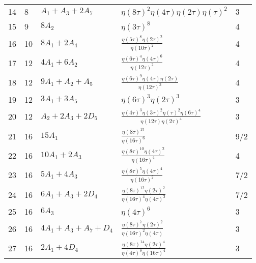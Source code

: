 \documentclass{article}
\theoremstyle{definition}
\begin{document}
\begin{longtable}{|l|l|l|l|l|}
  14 & 8 & $ A_{1} +  A_{3} + 2 A_{7}$ & $ \eta \left( 8\tau \right)   ^{2}\eta \left( 4\tau \right) \eta \left( 2\tau \right)   \eta \left( \tau \right)   ^{2}$ & 3 \\ 
  15 & 9 & $8 A_{2}$ & $ \eta \left( 3\tau \right)   ^{8}$ & 4 \\ 
  16 & 10 & $8 A_{1} + 2 A_{4}$ & ${\frac {  \eta \left( 5\tau \right)   ^{8}  \eta \left( 2\tau \right)   ^{2}}{  \eta \left( 10\tau \right)   ^{2}}}$ & 4 \\ 
  17 & 12 & $4 A_{1} + 6 A_{2}$ & ${\frac {  \eta \left( 6\tau \right)   ^{4}  \eta \left( 4\tau \right)   ^{6}}{  \eta \left( 12\tau \right)   ^{2}}}$ & 4 \\ 
  18 & 12 & $9 A_{1} +  A_{2} +  A_{5}$ & ${\frac {  \eta \left( 6\tau \right)   ^{9}\eta \left( 4\tau \right) \eta \left( 2\tau \right) }{  \eta \left( 12\tau \right)   ^{3}}}$ & 4 \\ 
  19 & 12 & $3 A_{1} + 3 A_{5}$ & $ \eta \left( 6\tau \right)   ^{3}  \eta \left( 2\tau \right)   ^{3}$ & 3 \\ 
  20 & 12 & $ A_{2} + 2 A_{3} + 2 D_{5}$ & ${\frac {  \eta \left( 4\tau \right)   ^{3}  \eta \left( 3\tau \right)   ^{2}  \eta \left( \tau \right)   ^{2} \mbox{}  \eta \left( 6\tau \right)   ^{4}}{\eta \left( 12\tau \right)   \eta \left( 2\tau \right)   ^{4}}}$ & 3 \\ 
  21 & 16 & $15 A_{1}$ & ${\frac {  \eta \left( 8\tau \right)   ^{15}}{  \eta \left( 16\tau \right)   ^{6}}}$ & 9/2 \\ 
  22 & 16 & $10 A_{1} + 2 A_{3}$ & ${\frac {  \eta \left( 8\tau \right)   ^{10}  \eta \left( 4\tau \right)   ^{2}}{  \eta \left( 16\tau \right)   ^{4}}}$ & 4 \\ 
  23 & 16 & $5 A_{1} + 4 A_{3}$ & ${\frac {  \eta \left( 8\tau \right)   ^{5}  \eta \left( 4\tau \right)   ^{4}}{  \eta \left( 16\tau \right)   ^{2}}}$ & 7/2 \\ 
  24 & 16 & $6 A_{1} +  A_{3} + 2 D_{4}$ & ${\frac {  \eta \left( 8\tau \right)   ^{12}  \eta \left( 2\tau \right)   ^{2}}{  \eta \left( 16\tau \right)   ^{4} \mbox{}  \eta \left( 4\tau \right)   ^{3}}}$ & 7/2 \\ 
  25 & 16 & $6 A_{3}$ & $ \eta \left( 4\tau \right)   ^{6}$ & 3 \\ 
  26 & 16 & $4 A_{1} +  A_{3} +  A_{7} +  D_{4}$ & ${\frac {  \eta \left( 8\tau \right)   ^{7}  \eta \left( 2\tau \right)   ^{2}}{  \eta \left( 16\tau \right)   ^{2} \mbox{}\eta \left( 4\tau \right) }}$ & 3 \\ 
  27 & 16 & $2 A_{1} + 4 D_{4}$ & ${\frac {  \eta \left( 8\tau \right)   ^{14}  \eta \left( 2\tau \right)   ^{4}}{  \eta \left( 4\tau \right)   ^{8} \mbox{}  \eta \left( 16\tau \right)   ^{4}}}$ & 3 \\ 

\end{longtable}
\end{document}
